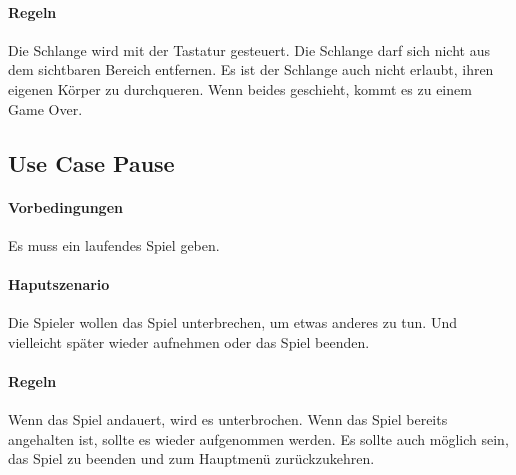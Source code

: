 \documentclass[a4paper, twosided, 11pt]{scrartcl}
\begin{document}
\paragraph{Regeln}
Die Schlange wird mit der Tastatur gesteuert. Die Schlange darf sich nicht aus
dem sichtbaren Bereich entfernen. Es ist der Schlange auch nicht erlaubt, ihren
eigenen Körper zu durchqueren. Wenn beides geschieht, kommt es zu einem Game
Over.


\subsection{Use Case Pause}
\paragraph{Vorbedingungen} Es muss ein laufendes Spiel geben.
\paragraph{Haputszenario}
Die Spieler wollen das Spiel unterbrechen, um etwas anderes zu tun. Und
vielleicht später wieder aufnehmen oder das Spiel beenden.
\paragraph{Regeln}
Wenn das Spiel andauert, wird es unterbrochen. Wenn das Spiel bereits
angehalten ist, sollte es wieder aufgenommen werden. Es sollte auch möglich
sein, das Spiel zu beenden und zum Hauptmenü zurückzukehren.
\end{document}

